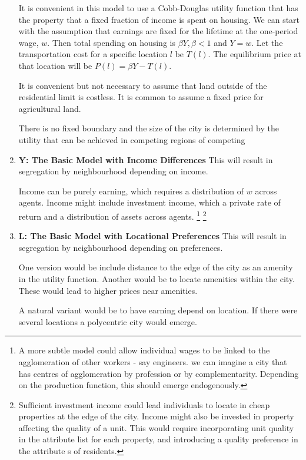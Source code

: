 \documentclass[preview, 12pt]{standalone}
\begin{document}
\begin{enumerate}
It is convenient in this model to use a Cobb-Douglas utility function that has the property that a fixed fraction of income is spent on housing.  We can start with the assumption that earnings are fixed for the lifetime at the one-period wage, $w$. Then total spending on housing is $\beta Y, \beta <1$ and $ Y=w$. Let the transportation cost for a specific location $l$ be $T(l)$. The  equilibrium price at that location will be $P(l)= \beta Y-T(l)$.


It is convenient but not necessary to assume that land outside of the residential limit is costless. It is common to assume a fixed price for agricultural land. 

There is no fixed boundary and the size of the city is determined by the utility that can be achieved in competing regions of competing


\item \textbf{Y: The Basic Model with Income Differences}
This will result in segregation by neighbourhood depending on income. 

Income can be purely earning, which requires a distribution of $w$ across agents. Income  might include investment income, which  a private rate of return and a distribution of assets across agents. \footnote{A more subtle model could allow individual wages to be linked to the agglomeration of other workers - say engineers. we can imagine a city that has centres of agglomeration by profession or by complementarity. Depending on the production function, this should emerge endogenously.}
\footnote{Sufficient investment income could lead individuals to locate in cheap properties at the edge of the city.  Income might also be invested in property affecting the quality of a unit. This would require incorporating unit quality in the attribute list for each property, and introducing a quality preference  in the attribute s of residents.}


\item \textbf{L: The Basic Model with Locational Preferences}
This will result in segregation by neighbourhood depending on preferences.

One version would be include distance to the edge of the city as an amenity in the utility function. Another would be to locate amenities within the city. These would lead to higher prices near amenities.

A natural variant would be to have earning depend on location. If there were several locations  a polycentric city would emerge.


\end{enumerate}
\end{document}
